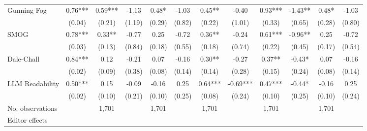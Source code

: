 \begin{table}
\begin{threeparttable}
\begin{tabular}{p{3cm}S@{}S@{}S@{}S@{}S@{}S@{}S@{}S@{}S@{}S@{}S@{}}
            Gunning Fog                   &        0.76***&        0.59***&       -1.13   &        0.48*  &       -1.03   &        0.45** &       -0.40   &        0.93***&       -1.43** &        0.48*  &       -1.03   \\
                                          &      (0.04)   &      (0.21)   &      (1.19)   &      (0.29)   &      (0.82)   &      (0.22)   &      (1.01)   &      (0.33)   &      (0.65)   &      (0.28)   &      (0.80)   \\
            SMOG                          &        0.78***&        0.33** &       -0.77   &        0.25   &       -0.72   &        0.36** &       -0.24   &        0.61***&       -0.96** &        0.25   &       -0.72   \\
                                          &      (0.03)   &      (0.13)   &      (0.84)   &      (0.18)   &      (0.55)   &      (0.18)   &      (0.74)   &      (0.22)   &      (0.45)   &      (0.17)   &      (0.54)   \\
            Dale-Chall                    &        0.84***&        0.12   &       -0.21   &        0.07   &       -0.16   &        0.30** &       -0.27   &        0.37** &       -0.43*  &        0.07   &       -0.16   \\
                                          &      (0.02)   &      (0.09)   &      (0.38)   &      (0.08)   &      (0.14)   &      (0.14)   &      (0.28)   &      (0.15)   &      (0.24)   &      (0.08)   &      (0.14)   \\
            LLM Readability        &        0.50***&        0.15   &       -0.09   &       -0.16   &        0.25   &        0.64***&       -0.69***&        0.47***&       -0.44*  &       -0.16   &        0.25   \\
                                          &      (0.02)   &      (0.10)   &      (0.21)   &      (0.10)   &      (0.25)   &      (0.08)   &      (0.24)   &      (0.10)   &      (0.25)   &      (0.10)   &      (0.24)   \\
            \midrule
            No. observations              &               &       1,701   &               &       1,701   &               &       1,701   &               &       1,701   &               &       1,701   &               \\
            \midrule
            Editor effects        &               &           {}   &               &           {}   &               &           {}   &               &           {}   &               &               &               \\

\end{tabular}
\end{threeparttable}
\end{table}
